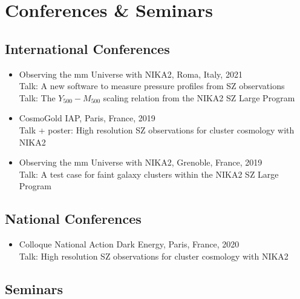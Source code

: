 \vspace{-20pt}
\section{Conferences \& Seminars}\label{talks}

\subsection{International Conferences}

\begin{itemize}[leftmargin=20pt]

    \item Observing the mm Universe with NIKA2, Roma, Italy, 2021 \\
        Talk: A new software to measure pressure profiles from SZ observations \\
        Talk: The $Y_{500}-M_{500}$ scaling relation from the NIKA2 SZ Large Program

    \item CosmoGold IAP, Paris, France, 2019 \\
        Talk + poster: High resolution SZ observations for cluster cosmology with NIKA2

    \item Observing the mm Universe with NIKA2, Grenoble, France, 2019 \\
        Talk: A test case for faint galaxy clusters within the NIKA2 SZ Large Program
\vspace{-5pt}
\end{itemize}

\subsection{National Conferences}

\begin{itemize}[leftmargin=20pt]

    \item Colloque National Action Dark Energy, Paris, France, 2020 \\
        Talk: High resolution SZ observations for cluster cosmology with NIKA2
\vspace{-5pt}
\end{itemize}

\subsection{Seminars}

